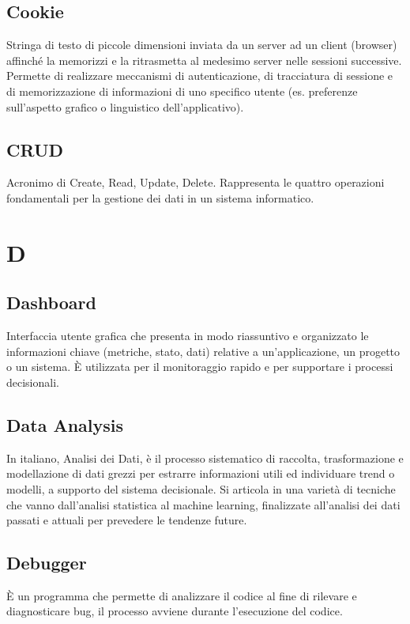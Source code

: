 \documentclass[10pt, letterpaper]{article}
\begin{document}
\subsection*{Cookie}
Stringa di testo di piccole dimensioni inviata da un server ad un client (browser) affinché la memorizzi e la ritrasmetta al medesimo server nelle sessioni successive. Permette di realizzare meccanismi di autenticazione, di tracciatura di sessione e di memorizzazione di informazioni di uno specifico utente (es. preferenze sull'aspetto grafico o linguistico dell'applicativo).


\subsection*{CRUD}
Acronimo di Create, Read, Update, Delete. Rappresenta le quattro operazioni fondamentali per la gestione dei dati in un sistema informatico.

\section{D}

\subsection*{Dashboard}
Interfaccia utente grafica che presenta in modo riassuntivo e organizzato le informazioni chiave (metriche, stato, dati) relative a un'applicazione, un progetto
o un sistema. È utilizzata per il monitoraggio rapido e per supportare i processi decisionali.

\subsection*{Data Analysis}
In italiano, Analisi dei Dati, è il processo sistematico di raccolta, trasformazione e modellazione di dati grezzi per estrarre informazioni utili ed individuare
trend o modelli, a supporto del sistema decisionale. Si articola in una varietà di tecniche che vanno dall'analisi statistica al machine learning, finalizzate all'analisi
dei dati passati e attuali per prevedere le tendenze future.

\subsection*{Debugger}
È un programma che permette di analizzare il codice al fine di rilevare e diagnosticare bug, il processo avviene durante l'esecuzione del codice.
\end{document}
